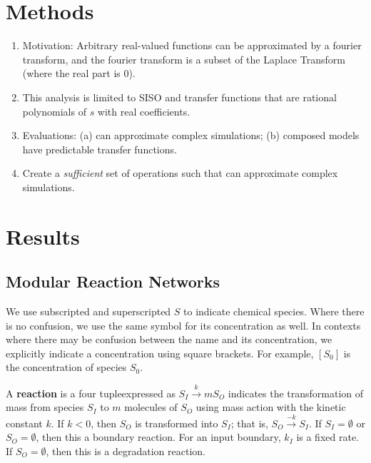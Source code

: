 \documentclass[unnumsec,webpdf,contemporary,large]{oup-authoring-template}%
\theoremstyle{thmstyleone}%
\theoremstyle{thmstyletwo}%
\theoremstyle{thmstylethree}%
\begin{document}
\section{Methods}\label{methods}
\begin{enumerate}
\item
Motivation: 
Arbitrary real-valued functions can be approximated by a fourier transform,
and the fourier transform is a subset of the Laplace Transform (where the real part is 0).
\item
This analysis is limited to SISO and transfer functions that
are rational polynomials of $s$ with real coefficients.
\item
Evaluations: (a) can approximate complex simulations; (b) composed models have predictable transfer functions.
\item
Create a {\em sufficient} set of operations such that can
approximate complex simulations.
\end{enumerate}



\section{Results}\label{results}
\subsection{Modular Reaction Networks}

We use subscripted and superscripted $S$ to indicate chemical species. Where there is no confusion, we use the same symbol for its concentration as well. In contexts where there may be confusion between the name and its concentration, we explicitly indicate a concentration using square brackets. For example, $[S_0]$ is the concentration of species $S_0$.

A {\bf reaction} is a four tupleexpressed as $S_I \xrightarrow{k} m S_O$
indicates the transformation of mass from species $S_I$ to $m$ molecules of $S_O$
using mass action with the kinetic constant $k$. If $k < 0$,
then $S_O$ is transformed into $S_I$; that is, $S_O \xrightarrow{-k} S_I$.
If $S_I = \emptyset$ or $S_O = \emptyset$, then this a boundary reaction.
For an input boundary, $k_I$ is a fixed rate.
If $S_O = \emptyset$, then this is a degradation reaction.
\end{document}
